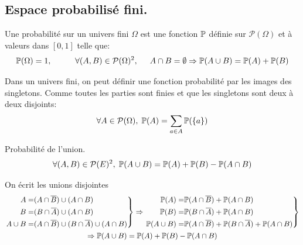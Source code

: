 \subsection{Espace probabilisé fini.}
\begin{defi}
 Une probabilité sur un univers fini $\Omega$ est une fonction $\mathbb{P}$ définie sur $\mathcal{P}(\Omega)$ et à valeurs dans $[0,1]$ telle que:
\begin{displaymath}
 \mathbb{P}(\Omega) = 1, \hspace{1cm} \forall (A,B)\in \mathcal{P}(\Omega)^2, \hspace{0.5cm} A\cap B = \emptyset \Rightarrow \mathbb{P}(A\cup B) = \mathbb{P}(A) + \mathbb{P}(B)
\end{displaymath}
\end{defi}
Dans un univers fini, on peut définir une fonction probabilité par les images des singletons. Comme toutes les parties sont finies et que les singletons sont deux à deux disjoints:
\begin{displaymath}
\forall A\in \mathcal{P}(\Omega), \; \mathbb{P}(A) = \sum_{a\in A} \mathbb{P}(\left\lbrace a \right\rbrace )
\end{displaymath}

\begin{prop}Probabilité de l'union.
 \begin{displaymath}
\forall (A,B) \in \mathcal{P}(E)^2, \; \mathbb{P}(A\cup B) = \mathbb{P}(A) + \mathbb{P}(B) - \mathbb{P}(A\cap B)  
 \end{displaymath}
\end{prop}
\begin{demo}
 On écrit les unions disjointes
\begin{multline*}
\left. 
\begin{aligned}
 A =& (A\cap \overline{B}) \cup (A\cap B) \\ B =& (B\cap \overline{A}) \cup (A\cap B)\\ A \cup B =& (A\cap \overline{B}) \cup (B\cap \overline{A}) \cup (A\cap B) 
\end{aligned}
\right\rbrace \Rightarrow
\left. 
\begin{aligned}
 \mathbb{P}(A) =& \mathbb{P}(A\cap \overline{B}) + \mathbb{P}(A\cap B) \\ \mathbb{P}(B) =& \mathbb{P}(B\cap \overline{A}) + \mathbb{P}(A\cap B)\\ 
 \mathbb{P}(A \cup B) =& \mathbb{P}(A\cap \overline{B}) + \mathbb{P}(B\cap \overline{A}) + \mathbb{P}(A\cap B)
\end{aligned}
\right\rbrace \\
\Rightarrow \mathbb{P}(A \cup B) = \mathbb{P}(A) + \mathbb{P}(B) - \mathbb{P}(A\cap B)
\end{multline*}
\end{demo}

